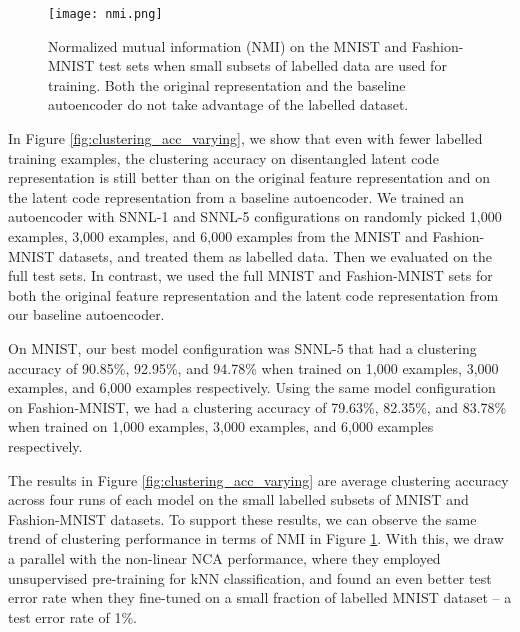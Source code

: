 \documentclass[conference]{IEEEtran}
\begin{document}
\begin{figure}[htb]
    \centering
    \texttt{[image: nmi.png]}
    \caption{Normalized mutual information (NMI) on the MNIST and Fashion-MNIST test sets when small subsets of labelled data are used for training. Both the original representation and the baseline autoencoder do not take advantage of the labelled dataset.}
    \label{fig:nmi_varying}
\end{figure}
In Figure \ref{fig:clustering_acc_varying}, we show that even with fewer labelled training examples, the clustering accuracy on disentangled latent code representation is still better than on the original feature representation and on the latent code representation from a baseline autoencoder. We trained an autoencoder with SNNL-1 and SNNL-5 configurations on randomly picked 1,000 examples, 3,000 examples, and 6,000 examples from the MNIST and Fashion-MNIST datasets, and treated them as labelled data. Then we evaluated on the full test sets. In contrast, we used the full MNIST and Fashion-MNIST sets for both the original feature representation and the latent code representation from our baseline autoencoder.

On MNIST, our best model configuration was SNNL-5 that had a clustering accuracy of 90.85\%, 92.95\%, and 94.78\% when trained on 1,000 examples, 3,000 examples, and 6,000 examples respectively. Using the same model configuration on Fashion-MNIST, we had a clustering accuracy of 79.63\%, 82.35\%, and 83.78\% when trained on 1,000 examples, 3,000 examples, and 6,000 examples respectively.













The results in Figure \ref{fig:clustering_acc_varying} are average clustering accuracy across four runs of each model on the small labelled subsets of MNIST and Fashion-MNIST datasets. To support these results, we can observe the same trend of clustering performance in terms of NMI in Figure \ref{fig:nmi_varying}. With this, we draw a parallel with the non-linear NCA\cite{salakhutdinov2007learning} performance, where they employed unsupervised pre-training for kNN classification, and found an even better test error rate when they fine-tuned on a small fraction of labelled MNIST dataset -- a test error rate of 1\%.
\end{document}
